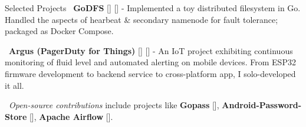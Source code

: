 \documentclass{resume}
\begin{document}
\begin{rSection}{Selected Projects}
  \textbullet\ \textbf{\textsf{GoDFS}} [\textbf{\href{https://rounakdatta.github.io/posts/godfs}{}}] [\textbf{\href{https://github.com/rounakdatta/GoDFS}{}}] - Implemented a  toy distributed filesystem in Go. Handled the aspects of hearbeat \& secondary namenode for fault tolerance; packaged as Docker Compose.

  \textbullet\ \textbf{\textsf{Argus (PagerDuty for Things)}} [\textbf{\href{https://rounakdatta.github.io/posts/pagerduty-for-iot}{}}] [\textbf{\href{https://github.com/rounakdatta?tab=repositories&q=argus}{}}] - An IoT project exhibiting continuous monitoring of fluid level and automated alerting on mobile devices. From ESP32 firmware development to backend service to cross-platform app, I solo-developed it all.

  \textbullet\ \emph{Open-source contributions} include projects like \textbf{\textsf{Gopass}} [\textbf{\href{https://github.com/gopasspw/gopassbridge}{}}], \textbf{\textsf{Android-Password-Store}} [\textbf{\href{https://github.com/android-password-store/Android-Password-Store}{}}], \textbf{\textsf{Apache Airflow}} [\textbf{\href{https://github.com/apache/airflow}{}}].

\end{rSection}
\end{document}
